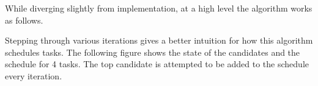 \documentclass[journal,12pt,onecolumn,draftclsnofoot,]{IEEEtran}
\begin{document}
While diverging slightly from implementation, at a high level the algorithm works as follows.

\begin{algorithmic}[1]
	\ELSE
	\ENDIF
	\ENDWHILE
\end{algorithmic}

Stepping through various iterations gives a better intuition for how this algorithm schedules tasks.
The following figure shows the state of the candidates and the schedule for 4 tasks.
The top candidate is attempted to be added to the schedule every iteration.

\end{document}

